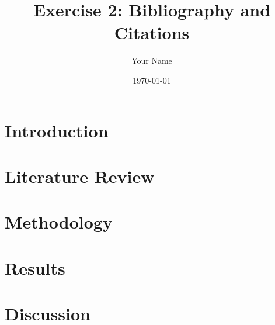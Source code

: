 \documentclass{article}
\title{Exercise 2: Bibliography and Citations}
\author{Your Name}
\date{\today}
\begin{document}
\maketitle

\section{Introduction}

\section{Literature Review}

\section{Methodology}

\section{Results}

\section{Discussion}

\printbibliography
\end{document}
